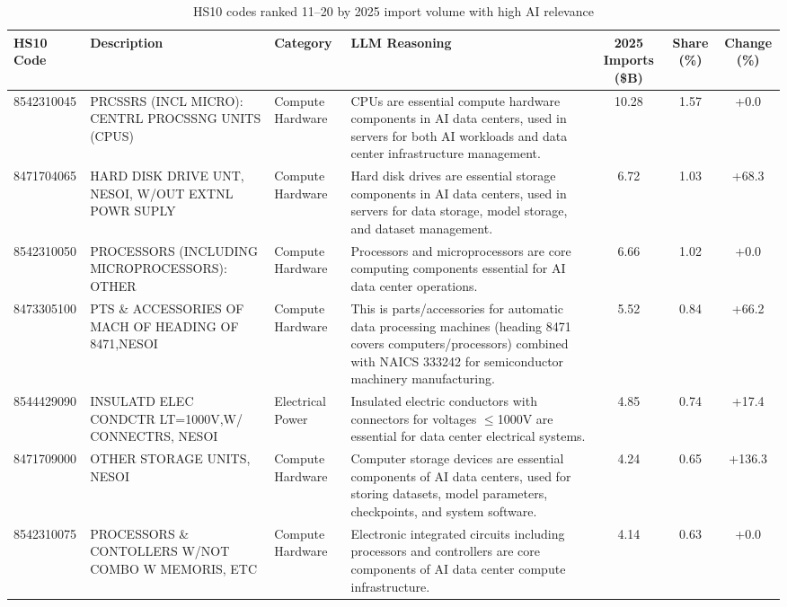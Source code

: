 \begin{landscape}
\begin{table}[htbp]
\centering
\footnotesize
\caption{HS10 codes ranked 11--20 by 2025 import volume with high AI relevance}
\label{tab:top11to20_high_relevance_landscape}
\setlength{\tabcolsep}{2mm}
\renewcommand{\arraystretch}{1.0}
\begin{tabular}{lp{4cm}lp{6cm}ccc}
\toprule
HS10 Code & Description & Category & LLM Reasoning & 2025 Imports (\$B) & Share (\%) & Change (\%) \\
\midrule
8542310045 & {\scriptsize PRCSSRS (INCL MICRO): CENTRL PROCSSNG UNITS (CPUS)} & Compute Hardware & {\scriptsize CPUs are essential compute hardware components in AI data centers, used in servers for both AI workloads and data center infrastructure management.} & 10.28 & 1.57 & +0.0 \\
8471704065 & {\scriptsize HARD DISK DRIVE UNT, NESOI, W/OUT EXTNL POWR SUPLY} & Compute Hardware & {\scriptsize Hard disk drives are essential storage components in AI data centers, used in servers for data storage, model storage, and dataset management.} & 6.72 & 1.03 & +68.3 \\
8542310050 & {\scriptsize PROCESSORS (INCLUDING MICROPROCESSORS): OTHER} & Compute Hardware & {\scriptsize Processors and microprocessors are core computing components essential for AI data center operations.} & 6.66 & 1.02 & +0.0 \\
8473305100 & {\scriptsize PTS \& ACCESSORIES OF MACH OF HEADING OF 8471,NESOI} & Compute Hardware & {\scriptsize This is parts/accessories for automatic data processing machines (heading 8471 covers computers/processors) combined with NAICS 333242 for semiconductor machinery manufacturing.} & 5.52 & 0.84 & +66.2 \\
8544429090 & {\scriptsize INSULATD ELEC CONDCTR LT=1000V,W/ CONNECTRS, NESOI} & Electrical Power & {\scriptsize Insulated electric conductors with connectors for voltages $\leq$1000V are essential for data center electrical systems.} & 4.85 & 0.74 & +17.4 \\
8471709000 & {\scriptsize OTHER STORAGE UNITS, NESOI} & Compute Hardware & {\scriptsize Computer storage devices are essential components of AI data centers, used for storing datasets, model parameters, checkpoints, and system software.} & 4.24 & 0.65 & +136.3 \\
8542310075 & {\scriptsize PROCESSORS \& CONTOLLERS W/NOT COMBO W MEMORIS, ETC} & Compute Hardware & {\scriptsize Electronic integrated circuits including processors and controllers are core components of AI data center compute infrastructure.} & 4.14 & 0.63 & +0.0 \\

\end{tabular}
\end{table}
\end{landscape}
